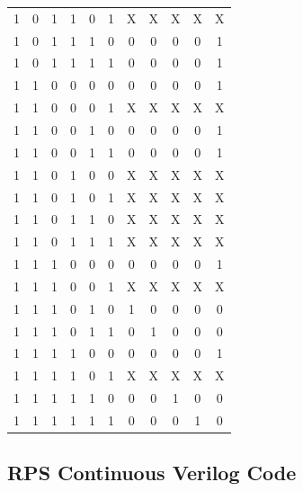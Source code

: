 \documentclass{article}
\begin{document}
\begin{center}
\begin{tabular}{c|c|c|c|c|c|c|c|c|c|c}
        1  &  0  &  1  &  1  &  0  &  1  &  X  &  X  &  X  &  X  &  X \\
        1  &  0  &  1  &  1  &  1  &  0  &  0  &  0  &  0  &  0  &  1 \\
        1  &  0  &  1  &  1  &  1  &  1  &  0  &  0  &  0  &  0  &  1 \\
        1  &  1  &  0  &  0  &  0  &  0  &  0  &  0  &  0  &  0  &  1 \\
        1  &  1  &  0  &  0  &  0  &  1  &  X  &  X  &  X  &  X  &  X \\
        1  &  1  &  0  &  0  &  1  &  0  &  0  &  0  &  0  &  0  &  1 \\
        1  &  1  &  0  &  0  &  1  &  1  &  0  &  0  &  0  &  0  &  1 \\
        1  &  1  &  0  &  1  &  0  &  0  &  X  &  X  &  X  &  X  &  X \\
        1  &  1  &  0  &  1  &  0  &  1  &  X  &  X  &  X  &  X  &  X \\
        1  &  1  &  0  &  1  &  1  &  0  &  X  &  X  &  X  &  X  &  X \\
        1  &  1  &  0  &  1  &  1  &  1  &  X  &  X  &  X  &  X  &  X \\
        1  &  1  &  1  &  0  &  0  &  0  &  0  &  0  &  0  &  0  &  1 \\
        1  &  1  &  1  &  0  &  0  &  1  &  X  &  X  &  X  &  X  &  X \\
        1  &  1  &  1  &  0  &  1  &  0  &  1  &  0  &  0  &  0  &  0 \\
        1  &  1  &  1  &  0  &  1  &  1  &  0  &  1  &  0  &  0  &  0 \\
        1  &  1  &  1  &  1  &  0  &  0  &  0  &  0  &  0  &  0  &  1 \\
        1  &  1  &  1  &  1  &  0  &  1  &  X  &  X  &  X  &  X  &  X \\
        1  &  1  &  1  &  1  &  1  &  0  &  0  &  0  &  1  &  0  &  0 \\
        1  &  1  &  1  &  1  &  1  &  1  &  0  &  0  &  0  &  1  &  0    
    \end{tabular}
\end{center}
\newpage
\subsection{RPS Continuous Verilog Code}
\begin{center}
\end{center}
\end{document}
